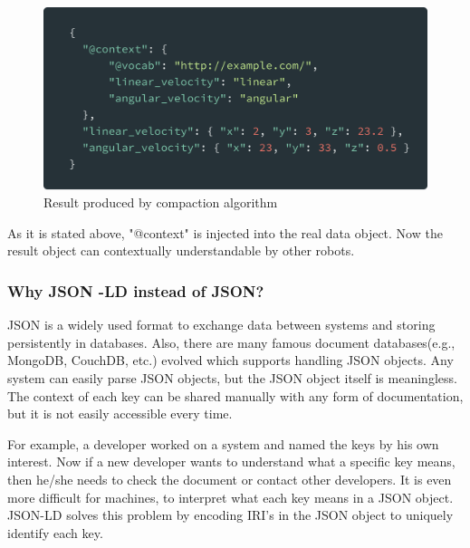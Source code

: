 	\begin{figure}[!htbp] 
		\begin{center}
			\includegraphics[scale=0.1]{./images/png/jsonld/compaction_3}	
			\caption{Result produced by compaction algorithm}	
			\label{fig:jsonld_compaction_3}	
		\end{center}
	\end{figure}	

	As it is stated above, "@context" is injected into the real data object. Now the result object can contextually understandable by other robots.
		
		
		\subsubsection{Why JSON -LD instead of JSON?}
		
		JSON is a widely used format to exchange data between systems and storing persistently in databases. Also, there are many famous document databases(e.g., MongoDB, CouchDB, etc.) evolved which supports handling JSON objects. Any system can easily parse JSON objects, but the JSON object itself is meaningless. The context of each key can be shared manually with any form of documentation, but it is not easily accessible every time.
		
		For example, a developer worked on a system and named the keys by his own interest. Now if a new developer wants to understand what a specific key means, then he/she needs to check the document or contact other developers. It is even more difficult for machines, to interpret what each key means in a JSON object. JSON-LD solves this problem by encoding IRI's in the JSON object to uniquely identify each key.
		
		
	

